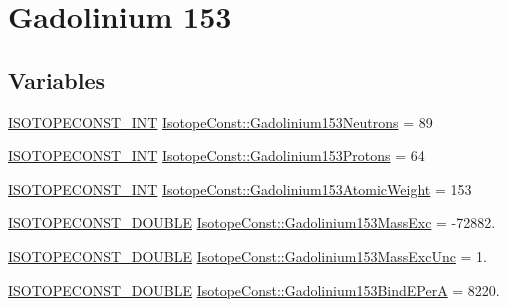 \hypertarget{group___isotope_const-_gadolinium-_gd153}{}\section{Gadolinium 153}
\label{group___isotope_const-_gadolinium-_gd153}
\subsection*{Variables}
\begin{DoxyCompactItemize}
\item 
\mbox{\hyperlink{group___isotope_const-_macros_ga5f18360b3e99483a35c32d789e62621c}{I\+S\+O\+T\+O\+P\+E\+C\+O\+N\+S\+T\+\_\+\+I\+NT}} \mbox{\hyperlink{group___isotope_const-_gadolinium-_gd153_ga18f2520fdc24f6429e063ebe1fe5f20f}{Isotope\+Const\+::\+Gadolinium153\+Neutrons}} = 89
\item 
\mbox{\hyperlink{group___isotope_const-_macros_ga5f18360b3e99483a35c32d789e62621c}{I\+S\+O\+T\+O\+P\+E\+C\+O\+N\+S\+T\+\_\+\+I\+NT}} \mbox{\hyperlink{group___isotope_const-_gadolinium-_gd153_ga464569cf41e60b4475796ae88067d298}{Isotope\+Const\+::\+Gadolinium153\+Protons}} = 64
\item 
\mbox{\hyperlink{group___isotope_const-_macros_ga5f18360b3e99483a35c32d789e62621c}{I\+S\+O\+T\+O\+P\+E\+C\+O\+N\+S\+T\+\_\+\+I\+NT}} \mbox{\hyperlink{group___isotope_const-_gadolinium-_gd153_gab943eb33b2ed6a8d34f0e458131a2463}{Isotope\+Const\+::\+Gadolinium153\+Atomic\+Weight}} = 153
\item 
\mbox{\hyperlink{group___isotope_const-_macros_ga8f45a7272ce02c0b4c65c44636ed719a}{I\+S\+O\+T\+O\+P\+E\+C\+O\+N\+S\+T\+\_\+\+D\+O\+U\+B\+LE}} \mbox{\hyperlink{group___isotope_const-_gadolinium-_gd153_ga9b73aa0a64ba0e5214cb04aba2e85976}{Isotope\+Const\+::\+Gadolinium153\+Mass\+Exc}} = -\/72882.
\item 
\mbox{\hyperlink{group___isotope_const-_macros_ga8f45a7272ce02c0b4c65c44636ed719a}{I\+S\+O\+T\+O\+P\+E\+C\+O\+N\+S\+T\+\_\+\+D\+O\+U\+B\+LE}} \mbox{\hyperlink{group___isotope_const-_gadolinium-_gd153_ga2f476d1a383579f4496be8a54d013adb}{Isotope\+Const\+::\+Gadolinium153\+Mass\+Exc\+Unc}} = 1.
\item 
\mbox{\hyperlink{group___isotope_const-_macros_ga8f45a7272ce02c0b4c65c44636ed719a}{I\+S\+O\+T\+O\+P\+E\+C\+O\+N\+S\+T\+\_\+\+D\+O\+U\+B\+LE}} \mbox{\hyperlink{group___isotope_const-_gadolinium-_gd153_ga3eb241a0a206b79eebb10af7c482f185}{Isotope\+Const\+::\+Gadolinium153\+Bind\+E\+PerA}} = 8220.

\end{DoxyCompactItemize}

